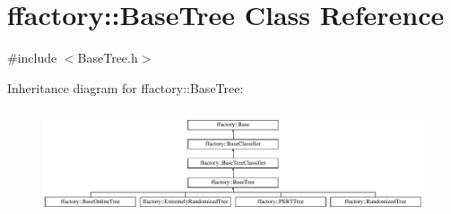 \hypertarget{classffactory_1_1_base_tree}{\section{ffactory\-:\-:Base\-Tree Class Reference}
\label{classffactory_1_1_base_tree}
}


{\ttfamily \#include $<$Base\-Tree.\-h$>$}

Inheritance diagram for ffactory\-:\-:Base\-Tree\-:\begin{figure}[H]
\begin{center}
\leavevmode
\includegraphics[height=3.196347cm]{classffactory_1_1_base_tree}
\end{center}
\end{figure}
